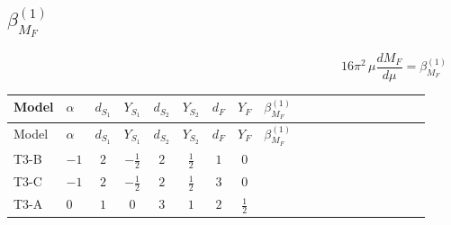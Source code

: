\documentclass{article}
\begin{document}
\begin{landscape}
\section*{$\beta_{M_F}^{(1)}$}
\[16\pi^2\,\mu\frac{d M_F}{d\mu}=\beta_{M_F}^{(1)}\]
\tiny
\begin{longtable}{@{}llcccccc >{\raggedright\arraybackslash}p{0.54\linewidth}@{}}
\toprule
Model & $\alpha$ & $d_{S_1}$ & $Y_{S_1}$ & $d_{S_2}$ & $Y_{S_2}$ & $d_F$ & $Y_F$ & $\beta_{M_F}^{(1)}$ \\
\midrule
\endfirsthead
\toprule
Model & $\alpha$ & $d_{S_1}$ & $Y_{S_1}$ & $d_{S_2}$ & $Y_{S_2}$ & $d_F$ & $Y_F$ & $\beta_{M_F}^{(1)}$ \\
\midrule
\endhead
T3-B & $-1$ & $2$ & $-\frac{1}{2}$ & $2$ & $\frac{1}{2}$ & $1$ & $0$ & \scriptsize\adjustbox{max width=\linewidth}{$\begin{gathered} \left(\left({M_F}\right)^{T}\,\left({y_1}\right)^{\dagger}\,{y_1}\right)_{ij} \\ +\left(\left({y_1}\right)^{T}\,\left({y_1}\right)^{*}\,{M_F}\right)_{ij} \\ +\left(\left({M_F}\right)^{T}\,\left({y_2}\right)^{\dagger}\,{y_2}\right)_{ij} \\ +\left(\left({y_2}\right)^{T}\,\left({y_2}\right)^{*}\,{M_F}\right)_{ij}\end{gathered}$} \\
\midrule
T3-C & $-1$ & $2$ & $-\frac{1}{2}$ & $2$ & $\frac{1}{2}$ & $3$ & $0$ & \scriptsize\adjustbox{max width=\linewidth}{$\begin{gathered} \frac{1}{2} (\left(\left({M_F}\right)^{T}\,\left({y_1}\right)^{\dagger}\,{y_1}\right)_{ij}+\left(\left({y_1}\right)^{T}\,\left({y_1}\right)^{*}\,{M_F}\right)_{ij}+\left(\left({M_F}\right)^{T}\,\left({y_2}\right)^{\dagger}\,{y_2}\right)_{ij}+\left(\left({y_2}\right)^{T}\,\left({y_2}\right)^{*}\,{M_F}\right)_{ij}) \\ -6 {g_2}^2 (\left(\left({M_F}\right)^{T}\right)_{ij}+\left({M_F}\right)_{ij})\end{gathered}$} \\
\midrule
T3-A & $0$ & $1$ & $0$ & $3$ & $1$ & $2$ & $\frac{1}{2}$ & \scriptsize\adjustbox{max width=\linewidth}{$\begin{gathered} \frac{1}{4} (2 \left(\left({y_1}\right)^{T}\,\left({y_1}\right)^{*}\,{M_F}\right)_{ij}+3 \left({M_F}\,\left({y_2}\right)^{\dagger}\,{y_2}\right)_{ij}) \\ -\frac{9}{2} {g_2}^2 \left({M_F}\right)_{ij} \\ -\frac{3}{2} {g_Y}^2 \left({M_F}\right)_{ij}\end{gathered}$} \\

\end{longtable}
\end{landscape}
\end{document}
